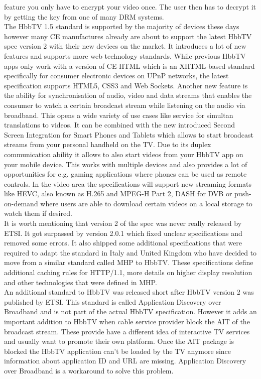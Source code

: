 feature you only have to encrypt your video once. The user then has to decrypt it by getting the
key from one of many DRM systems.\\
The HbbTV 1.5 standard is supported by the majority of devices these days however many CE manufactures
already are about to support the latest HbbTV spec version 2 with their new devices on the market.
It introduces a lot of new features and supports more web technology standards. While previous HbbTV
apps only work with a version of CE-HTML which is an XHTML-based standard specifically for consumer
electronic devices on UPnP networks, the latest specification supports HTML5, CSS3 and Web Sockets.
Another new feature is the ability for synchronisation of audio, video and data streams that enables
the consumer to watch a certain broadcast stream while listening on the audio via broadband. This
opens a wide variety of use cases like service for simultan translations to videos. It can be
combined with the new introduced Second Screen Integration for Smart Phones and Tablets which
allows to start broadcast streams from your personal handheld on the TV. Due to its duplex
communication ability it allows to also start videos from your HbbTV app on your mobile device.
This works with multiple devices and also provides a lot of opportunities for e.g. gaming applications
where phones can be used as remote controls. In the video area the specifications will support
new streaming formats like HEVC, also known as H.265 and MPEG-H Part 2, DASH for DVB or
push-on-demand where users are able to download certain videos on a local storage to watch them
if desired.\\
It is worth mentioning that version 2 of the spec was never really released by ETSI. It got
surpassed by version 2.0.1 which fixed unclear specifications and removed some errors. It also
shipped some additional specifications that were required to adapt the standard in Italy and United
Kingdom who have decided to move from a similar standard called MHP to HbbTV. These specifications
define additional caching rules for HTTP/1.1, more details on higher display resolution and other
technologies that were defined in MHP.\\
An additional standard to HbbTV was released short after HbbTV version 2 was published by ETSI.
This standard is called Application Discovery over Broadband and is not part of the actual
HbbTV specification. However it adds an important addition to HbbTV when cable service provider block
the AIT of the broadcast stream. These provide have a different idea of interactive TV services
and usually want to promote their own platform. Once the AIT package is blocked the HbbTV application
can't be loaded by the TV anymore since information about application ID and URL are missing.
Application Discovery over Broadband is a workaround to solve this problem.

